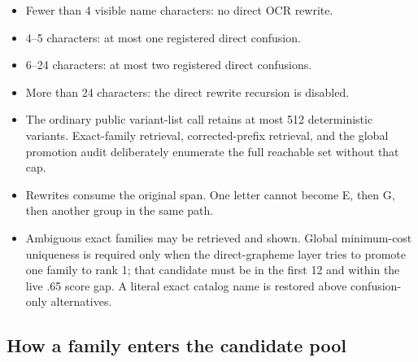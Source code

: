 \documentclass[10pt,a4paper]{article}
\begin{document}
\begin{itemize}
\item Fewer than 4 visible name characters: no direct OCR rewrite.
\item 4--5 characters: at most one registered direct confusion.
\item 6--24 characters: at most two registered direct confusions.
\item More than 24 characters: the direct rewrite recursion is disabled.
\item The ordinary public variant-list call retains at most 512 deterministic
variants. Exact-family retrieval, corrected-prefix retrieval, and the global
promotion audit deliberately enumerate the full reachable set without that cap.
\item Rewrites consume the original span. One letter cannot become E, then G,
then another group in the same path.
\item Ambiguous exact families may be retrieved and shown. Global minimum-cost
uniqueness is required only when the direct-grapheme layer tries to promote one
family to rank 1; that candidate must be in the first 12 and within the live
.65 score gap. A literal exact catalog name is restored above confusion-only
alternatives.
\end{itemize}

\subsection{How a family enters the candidate pool}
\end{document}
